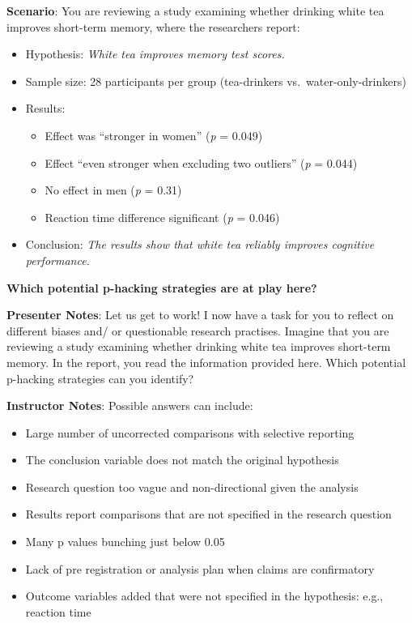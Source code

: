 \documentclass[
  letterpaper,
  DIV=11,
  numbers=noendperiod]{scrartcl}
\providecommand{\tightlist}{%
  \setlength{\itemsep}{0pt}\setlength{\parskip}{0pt}}
\begin{document}
\textbf{Scenario}: You are reviewing a study examining whether drinking
white tea improves short-term memory, where the researchers report:

\begin{itemize}
\item
  Hypothesis: \emph{White tea improves memory test scores.}
\item
  Sample size: 28 participants per group (tea-drinkers
  vs.~water-only-drinkers)
\item
  Results:

  \begin{itemize}
  \tightlist
  \item
    Effect was ``stronger in women'' (\emph{p} = 0.049)
  \item
    Effect ``even stronger when excluding two outliers'' (\emph{p} =
    0.044)
  \item
    No effect in men (\emph{p} = 0.31)
  \item
    Reaction time difference significant (\emph{p} = 0.046)
  \end{itemize}
\item
  Conclusion: \emph{The results show that white tea reliably improves
  cognitive performance.}
\end{itemize}

\textbf{Which potential p-hacking strategies are at play here?}

\textbf{Presenter Notes}: Let us get to work! I now have a task for you
to reflect on different biases and/ or questionable research practises.
Imagine that you are reviewing a study examining whether drinking white
tea improves short-term memory. In the report, you read the information
provided here. Which potential p-hacking strategies can you identify?

\textbf{Instructor Notes}: Possible answers can include:

\begin{itemize}
\item
  Large number of uncorrected comparisons with selective reporting
\item
  The conclusion variable does not match the original hypothesis
\item
  Research question too vague and non-directional given the analysis
\item
  Results report comparisons that are not specified in the research
  question
\item
  Many p values bunching just below 0.05
\item
  Lack of pre registration or analysis plan when claims are confirmatory
\item
  Outcome variables added that were not specified in the hypothesis:
  e.g., reaction time
\end{itemize}
\end{document}
